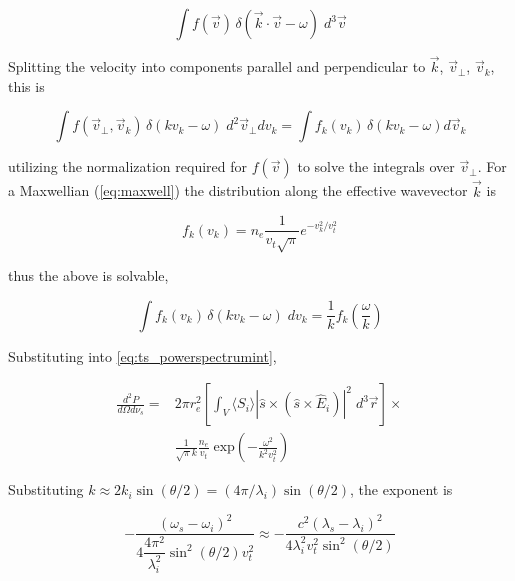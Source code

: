 \begin{equation}
 \int f(\vec{v}) \, \delta(\vec{k} \cdot \vec{v} - \omega) \;d^3 \vec{v}
\end{equation}

\noindent Splitting the velocity into components parallel and perpendicular to $\vec{k}$, $\vec{v}_\perp$, $\vec{v}_k$, this is

\begin{equation}
 \int f(\vec{v}_\perp,\vec{v}_k) \, \delta(kv_k - \omega) \;d^2 \vec{v}_\perp dv_k = \int f_k(v_k) \,\delta(kv_k - \omega) d\vec{v}_k
\end{equation}

\noindent utilizing the normalization required for $f(\vec{v})$ to solve the integrals over $\vec{v}_\perp$.  For a Maxwellian (\cref{eq:maxwell}) the distribution along the effective wavevector $\vec{k}$ is

\begin{equation}\label{eq:ts_fk}
 f_k(v_k) = n_e \frac{1}{v_t \sqrt{\pi}} e^{-v_k^2/v_t^2}
\end{equation}

\noindent thus the above is solvable,

\begin{equation}
 \int f_k(v_k) \,\delta(kv_k - \omega) \;dv_k = \frac{1}{k} f_k\left(\frac{\omega}{k}\right)
\end{equation}

\noindent Substituting into \cref{eq:ts_powerspectrumint},

\begin{equation}\label{eq:ts_powerspectrimint2}
 \begin{aligned}
 \frac{d^2 P}{d\Omega d\nu_s} = &2\pi r_e^2 \left[ \int_V \langle S_i \rangle \left| \hat{s} \times \left( \hat{s} \times \hat{E}_i \right) \right|^2 \;d^3 \vec{r} \right] \times\\ &\frac{1}{\sqrt{\pi}k} \frac{n_e}{v_t} \;\mbox{exp}\left(-\frac{\omega^2}{k^2 v_t^2} \right)
 \end{aligned}
\end{equation}

\noindent Substituting $k \approx 2k_i \sin(\theta/2) = \left(4\pi/\lambda_i\right) \sin(\theta/2)$, the exponent is

\begin{equation}\label{eq:ts_exp}
 -\frac{(\omega_s - \omega_i)^2}{4\dfrac{4\pi^2}{\lambda_i^2} \sin^2 \left(\theta/2\right) v_t^2} \approx -\frac{c^2 (\lambda_s - \lambda_i)^2}{4\lambda_i^2 v_t^2 \sin^2(\theta/2)}
\end{equation}

